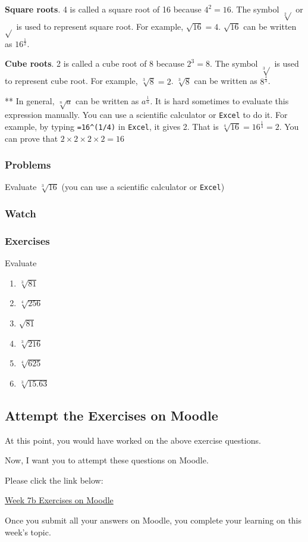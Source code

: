 \documentclass[
  letterpaper,
  DIV=11,
  numbers=noendperiod]{scrartcl}
\begin{document}
\textbf{Square roots}. 4 is called a square root of 16 because
\(4^2=16\). The symbol \(\sqrt[2]{}\) or \(\sqrt{}\) is used to
represent square root. For example, \(\sqrt{16}=4\). \(\sqrt{16}\) can
be written as \(16^\frac{1}{2}\).

\textbf{Cube roots}. 2 is called a cube root of 8 because \(2^3=8\). The
symbol \(\sqrt[3]{}\) is used to represent cube root. For example,
\(\sqrt[3]{8}=2\). \(\sqrt[3]{8}\) can be written as \(8^\frac{1}{3}\).

** In general, \(\sqrt[n]{a}\) can be written as \(a^\frac{1}{n}\). It
is hard sometimes to evaluate this expression manually. You can use a
scientific calculator or \texttt{Excel} to do it. For example, by typing
\texttt{=16\^{}(1/4)} in \texttt{Excel}, it gives 2. That is
\(\sqrt[4]{16}=16^\frac{1}{4}=2\). You can prove that
\(2 \times 2 \times 2 \times 2 = 16\)

\hypertarget{problems-1}{%
\subsubsection{Problems}\label{problems-1}}

Evaluate \(\sqrt[3]{16}\) (you can use a scientific calculator or
\texttt{Excel})

\hypertarget{watch-1}{%
\subsubsection{Watch}\label{watch-1}}

\hypertarget{exercises-1}{%
\subsubsection{Exercises}\label{exercises-1}}

Evaluate

\begin{enumerate}
\def\labelenumi{\arabic{enumi}.}
\item
  \(\sqrt[3]{81}\)
\item
  \(\sqrt[4]{256}\)
\item
  \(\sqrt{81}\)
\item
  \(\sqrt[3]{216}\)
\item
  \(\sqrt[4]{625}\)
\item
  \(\sqrt[3]{15.63}\)
\end{enumerate}

\hypertarget{attempt-the-exercises-on-moodle-1}{%
\subsection{Attempt the Exercises on
Moodle}\label{attempt-the-exercises-on-moodle-1}}

At this point, you would have worked on the above exercise questions.

Now, I want you to attempt these questions on Moodle.

Please click the link below:

\href{https://modules.lancaster.ac.uk/mod/quiz/view.php?id=2235175}{Week
7b Exercises on Moodle}

Once you submit all your answers on Moodle, you complete your learning
on this week's topic.
\end{document}
